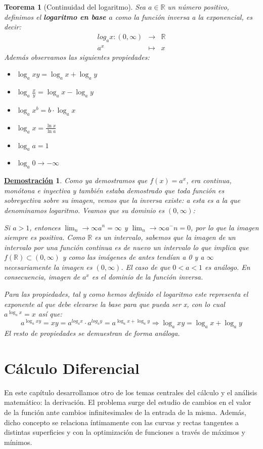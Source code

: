 \documentclass[10pt,a4paper,openright]{book}
\theoremstyle{break}
\newtheorem{theo}{Teorema}[chapter]
\newtheorem*{demo}{\underline{Demostración}}
\begin{document}
\begin{theo}[Continuidad del logaritmo]
Sea $a\in \mathbb{R}$ un número positivo, definimos el \textbf{logaritmo en base $a$} como la función inversa a la exponencial, es decir:
\begin{eqnarray*} log_a x: (0,\infty) &\longrightarrow& \mathbb R \\ a^x &\longmapsto& x \end{eqnarray*}
Además observamos las siguientes propiedades:
\begin{itemize}
\item $\log_a xy = \log_a x + \log_a y$
\item $\log_a \frac{x}{y} = \log_a x - \log_a y$
\item $\log_a x^b = b\cdot \log_a x$
\item $\log_a x = \frac{\ln x}{\ln a}$
\item $\log_a a = 1$
\item $\log_a 0 \rightarrow -\infty$
\end{itemize}
\end{theo}
\begin{demo}
Como ya demostramos que $f(x)=a^x$, era continua, monótona e inyectiva y también estaba demostrado que toda función es sobreyectiva sobre su imagen, vemos que la inversa existe: a esta es a la que denominamos \textit{logaritmo}. Veamos que su dominio es $(0,\infty)$:\par
Si $a>1$, entonces $\lim_n\rightarrow \infty a^n = \infty$ y $\lim_n\rightarrow \infty a^-n = 0$, por lo que la imagen siempre es positiva. Como $\mathbb R$ es un intervalo, sabemos que la imagen de un intervalo por una función continua es de nuevo un intervalo lo que implica que $f(\mathbb R)\subset (0,\infty)$ y como las imágenes de antes tendían a 0 y a $\infty$ necesariamente la imagen es $(0,\infty)$. El caso de que $0<a<1$ es análogo. En consecuencia, imagen de $a^x$ es el dominio de la función inversa.

Para las propiedades, tal y como hemos definido el logaritmo este representa el exponente al que debe elevarse la base para que pueda ser x, con lo cual $a^{\log_a x} = x$ así que:
$$a^{\log_a xy}= xy=a^{log_a x}\cdot a^{log_a y}=a^{\log_a x + \log_a y}\Rightarrow \log_a xy = \log_a x +\log_a y$$
El resto de propiedades se demuestran de forma análoga.
\end{demo}

\chapter{Cálculo Diferencial}
En este capítulo desarrollamos otro de los temas centrales del cálculo y el análisis matemático: la derivación. El problema surge del estudio de cambios en el valor de la función ante cambios infinitesimales de la entrada de la misma. Además, dicho concepto se relaciona íntimamente con las curvas y rectas tangentes a distintas superficies y con la optimización de funciones a través de máximos y mínimos.
\end{document}
